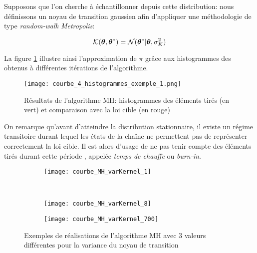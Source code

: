  Supposons que l'on cherche à échantillonner depuis cette distribution: nous définissons un noyau de transition  gaussien afin d'appliquer une méthodologie de type \textit{random-walk Metropolis}: 

\begin{equation}
{\mathcal{K}}({\bm{\theta}}, {{\bm{\theta}}^*} ) = \mathcal{N}({{\bm{\theta}}^*} | {\bm{\theta}}, \sigma_{K}^2)
\label{eq_noyau_gaussien}
\end{equation}

La figure \ref{fig_courbe_4_histogrammes_exemple_1} illustre ainsi l'approximation de $\pi$ grâce aux histogrammes des  obtenus à différentes itérations de l'algorithme. 

\begin{figure}[h!]
	\centering
	\texttt{[image: courbe\_4\_histogrammes\_exemple\_1.png]}
	\caption{Résultats de l'algorithme MH: histogrammes des éléments tirés (en vert) et comparaison avec la loi cible (en rouge)}
	\label{fig_courbe_4_histogrammes_exemple_1}
\end{figure}

On remarque qu'avant d'atteindre la distribution stationnaire, il existe un régime transitoire durant lequel les états de la chaîne ne permettent pas de représenter correctement la loi cible. Il est alors d'usage de ne pas tenir compte des éléments tirés durant cette période , appelée \textit{temps de chauffe} ou \textit{burn-in}. \\


\begin{figure}[h!]
	\centering
	\begin{subfigure}[t]{0.5\textwidth}
		\centering
		\texttt{[image: courbe\_MH\_varKernel\_1]}
		\caption{}
		\label{subfig_varK_1}
	\end{subfigure}%
	~ 
	\begin{subfigure}[t]{0.5\textwidth}
		\centering
		\texttt{[image: courbe\_MH\_varKernel\_8]}
		\caption{}
		\label{subfig_varK_8}
	\end{subfigure}
	\begin{subfigure}{0.5\textwidth}
		\centering
		\texttt{[image: courbe\_MH\_varKernel\_700]}
		\caption{}
		\label{subfig_varK_700}
	\end{subfigure}
	
	\caption{Exemples de réalisations de l'algorithme MH avec 3 valeurs différentes pour la variance du noyau de transition}
\end{figure}

